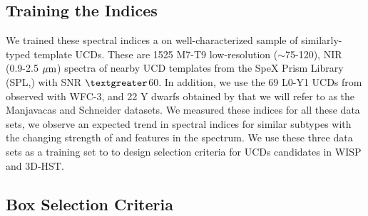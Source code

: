 \documentclass[manuscript]{aastex}
\begin{document}
\subsection{Training the Indices}\label{trainset}

We trained these spectral indices a on well-characterized sample of similarly-typed template UCDs. These are 1525 M7-T9 low-resolution ($\sim$75-120), NIR (0.9-2.5 $\mbox{$\mu$m}$) spectra of nearby UCD templates from the SpeX Prism Library (SPL,\citealt{2014arXiv1406.4887B}) with SNR $ \textgreater$60. In addition, we use the 69 L0-Y1 UCDs from \cite{Manjavacas2018} observed with  WFC-3, and 22 Y dwarfs obtained by \cite{Schneider2015} that we will refer to as the Manjavacas and Schneider datasets. We measured  these indices for all these data sets, we observe an expected trend in spectral indices for similar subtypes with the changing strength of \wat and \meth features in the spectrum. We use these  three data sets as a training set to to design selection criteria for UCDs candidates in WISP and 3D-HST.

\subsection{Box Selection Criteria} \label{boxselection}
\end{document}
